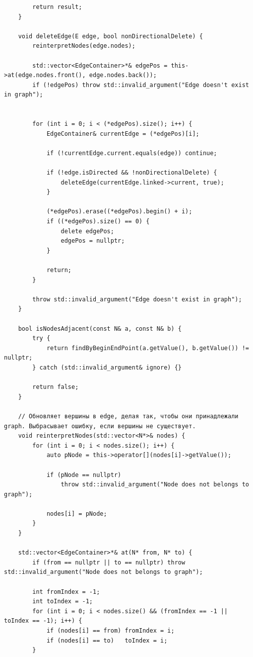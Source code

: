 \documentclass[a4paper,14pt]{extarticle}
\begin{document}
\begin{enumerate}[1.]
\begin{verbatim}
        return result;
    }

    void deleteEdge(E edge, bool nonDirectionalDelete) {
        reinterpretNodes(edge.nodes);

        std::vector<EdgeContainer>*& edgePos = this->at(edge.nodes.front(), edge.nodes.back());
        if (!edgePos) throw std::invalid_argument("Edge doesn't exist in graph");
        
        
        for (int i = 0; i < (*edgePos).size(); i++) {
            EdgeContainer& currentEdge = (*edgePos)[i];

            if (!currentEdge.current.equals(edge)) continue;

            if (!edge.isDirected && !nonDirectionalDelete) {
                deleteEdge(currentEdge.linked->current, true);
            }

            (*edgePos).erase((*edgePos).begin() + i);
            if ((*edgePos).size() == 0) {
                delete edgePos;
                edgePos = nullptr;
            }

            return;
        }

        throw std::invalid_argument("Edge doesn't exist in graph");
    }

    bool isNodesAdjacent(const N& a, const N& b) {
        try {
            return findByBeginEndPoint(a.getValue(), b.getValue()) != nullptr;
        } catch (std::invalid_argument& ignore) {}

        return false;
    }

    // Обновляет вершины в edge, делая так, чтобы они принадлежали graph. Выбрасывает ошибку, если вершины не существует.
    void reinterpretNodes(std::vector<N*>& nodes) {
        for (int i = 0; i < nodes.size(); i++) {
            auto pNode = this->operator[](nodes[i]->getValue());

            if (pNode == nullptr)
                throw std::invalid_argument("Node does not belongs to graph");

            nodes[i] = pNode;
        }
    }

    std::vector<EdgeContainer>*& at(N* from, N* to) {
        if (from == nullptr || to == nullptr) throw std::invalid_argument("Node does not belongs to graph");

        int fromIndex = -1;
        int toIndex = -1;
        for (int i = 0; i < nodes.size() && (fromIndex == -1 || toIndex == -1); i++) {
            if (nodes[i] == from) fromIndex = i;
            if (nodes[i] == to)   toIndex = i;
        }


\end{verbatim}
\end{enumerate}
\end{document}
